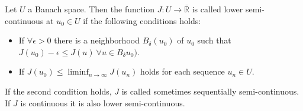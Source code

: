 \begin{definition}
	Let $U$ a Banach space. Then the function $J:U\rightarrow \overline{\mathbb{R}}$ is called lower semi-continuous at $u_0 \in U$ if the following conditions holds:
	\begin{itemize}
		\item If $\forall \epsilon > 0$ there is a neighborhood $B_\delta (u_0)$ of $u_0$ such that $J(u_0)-\epsilon \leq J(u) \ \forall u \in B_\delta{u_0)}$.
		\item If $J(u_0)\leq\liminf_{n\rightarrow \infty} J(u_n)$ holds for each sequence $u_n \in U$.
	\end{itemize}
\end{definition}

\begin{remark}
	If the second condition holds, $J$ is called sometimes sequentially semi-continuous. If $J$ is continuous it is also lower semi-continuous.
\end{remark}
